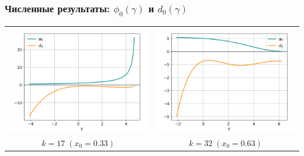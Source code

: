 \documentclass[fullscreen=true, unicode, bookmarks=false]{beamer}
\begin{document}
\begin{frame}
\frametitle{ Численные результаты: $ \phi_0(\gamma) $ и $ d_0(\gamma) $ }

\begin{center}
\begin{tabular}{cc}
\includegraphics[scale=0.32]{divergent_phi0d0_033.png} &
\includegraphics[scale=0.32]{divergent_phi0d0_063.png} \\
\small{$k=17\;(x_0=0.33)$ } & \small{$k=32\;(x_0=0.63)$ } \\
\end{tabular}
\end{center}

\vfill


\end{frame}
\end{document}
